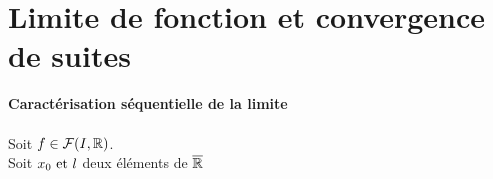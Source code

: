 \documentclass[12pt,twoside,a4paper]{article}
\begin{document}
	\section{Limite de fonction et convergence de suites}
		\begin{prop}
			\textbf{Caractérisation séquentielle de la limite}\\
			\\
			Soit $f\in\mathcal{F}(I,\mathbb{R})$.\\
			Soit $x_0\text{ et } l$ deux éléments de $\overline{\mathbb{R}}$
		\end{prop}
\end{document}
